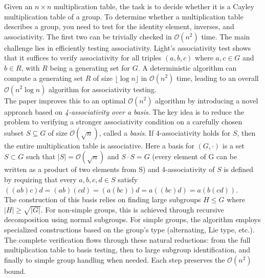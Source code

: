 
Given an \(n \times n\) multiplication table, the task is to decide whether it is a Cayley multiplication table of a group. To determine whether a multiplication table describes a group, you need to test for the identity element, inverses, and associativity. The first two can be trivially checked in \(\mathcal{O}(n^2)\) time. The main challenge lies in efficiently testing associativity. Light's associativity test shows that it suffices to verify associativity for all triples \((a, b, c)\) where \(a, c \in G\) and \(b \in R\), with \(R\) being a generating set for \(G\). A deterministic algorithm can compute a generating set \(R\) of size \(\lfloor \log n \rfloor\) in \(\mathcal{O}(n^2)\) time, leading to an overall \(\mathcal{O}(n^2 \log n)\) algorithm for associativity testing. 
\\
The paper improves this to an optimal \(\mathcal{O}(n^2)\) algorithm by introducing a novel approach based on \emph{4-associativity over a basis}. The key idea is to reduce the problem to verifying a stronger associativity condition on a carefully chosen subset \(S \subseteq G\) of size \(\mathcal{O}(\sqrt{n})\), called a \emph{basis}. If 4-associativity holds for \(S\), then the entire multiplication table is associative. Here a basis for \((G, \cdot)\) is a set \(S \subset G\) such that \(|S| = \mathcal{O}(\sqrt{n})\) and \(S \cdot S = G\) (every element of G can be written as a product of two elements from S) and 4-associativity of \(S\) is defined by requiring that every \(a, b, c, d \in S\) satisfy \(((ab)c)d = (ab)(cd) = (a(bc))d = a((bc)d) = a(b(cd))\).
\\
The construction of this basis relies on finding large subgroups \(H \leq G\) where \(|H| \geq \sqrt{|G|}\). For non-simple groups, this is achieved through recursive decomposition using normal subgroups. For simple groups, the algorithm employs specialized constructions based on the group's type (alternating, Lie type, etc.).
The complete verification flows through these natural reductions: from the full multiplication table to basis testing, then to large subgroup identification, and finally to simple group handling when needed. Each step preserves the \(\mathcal{O}(n^2)\) bound.